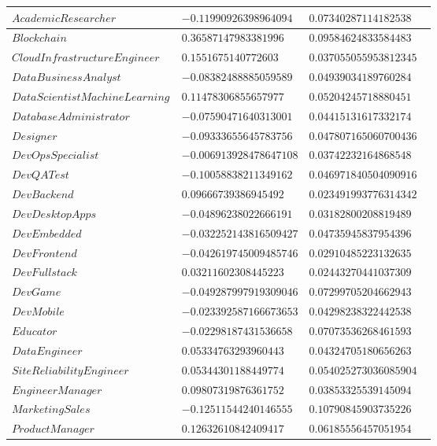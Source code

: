 \documentclass{report}
\begin{document}
\begin{longtable}{|R{0.4\linewidth}|R{0.3\linewidth}|R{0.3\linewidth}|}
  \hline
  $AcademicResearcher$ & $-0.11990926398964094$ & $0.07340287114182538$\\
  \hline
  $Blockchain$ & $0.36587147983381996$ & $0.09584624833584483$\\
  \hline
  $CloudInfrastructureEngineer$ & $0.1551675140772603$ & $0.037055055953812345$\\
  \hline
  $DataBusinessAnalyst$ & $-0.08382488885059589$ & $0.04939034189760284$\\
  \hline
  $DataScientistMachineLearning$ & $0.11478306855657977$ & $0.05204245718880451$\\
  \hline
  $DatabaseAdministrator$ & $-0.07590471640313001$ & $0.04415131617332174$\\
  \hline
  $Designer$ & $-0.09333655645783756$ & $0.047807165060700436$\\
  \hline
  $DevOpsSpecialist$ & $-0.006913928478647108$ & $0.03742232164868548$\\
  \hline
  $DevQATest$ & $-0.10058838211349162$ & $0.046971840504090916$\\
  \hline
  $DevBackend$ & $0.09666739386945492$ & $0.023491993776314342$\\
  \hline
  $DevDesktopApps$ & $-0.04896238022666191$ & $0.03182800208819489$\\
  \hline
  $DevEmbedded$ & $-0.032252143816509427$ & $0.04735945837954396$\\
  \hline
  $DevFrontend$ & $-0.042619745009485746$ & $0.02910485223132635$\\
  \hline
  $DevFullstack$ & $0.03211602308445223$ & $0.02443270441037309$\\
  \hline
  $DevGame$ & $-0.049287997919309046$ & $0.07299705204662943$\\
  \hline
  $DevMobile$ & $-0.023392587166673653$ & $0.04298238322442538$\\
  \hline
  $Educator$ & $-0.02298187431536658$ & $0.07073536268461593$\\
  \hline
  $DataEngineer$ & $0.05334763293960443$ & $0.04324705180656263$\\
  \hline
  $SiteReliabilityEngineer$ & $0.05344301188449774$ & $0.054025273036085904$\\
  \hline
  $EngineerManager$ & $0.09807319876361752$ & $0.03853325539145094$\\
  \hline
  $MarketingSales$ & $-0.12511544240146555$ & $0.10790845903735226$\\
  \hline
  $ProductManager$ & $0.12632610842409417$ & $0.06185556457051954$\\

\end{longtable}
\end{document}
